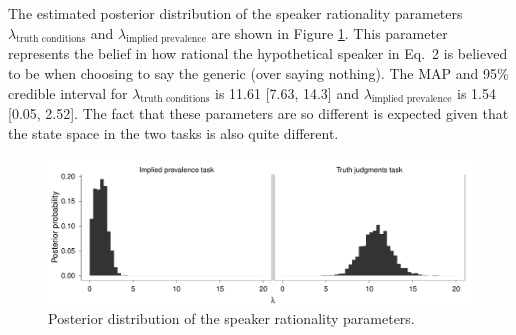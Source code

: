 \documentclass[10pt,letterpaper]{article}
\begin{document}
The estimated posterior distribution of the speaker rationality parameters $\lambda_{\text{truth conditions}}$ and $\lambda_{\text{implied prevalence}}$ are shown in Figure \ref{fig:rationality2}. 
This parameter represents the belief in how rational the hypothetical speaker in Eq.~2 is believed to be when choosing to say the generic (over saying nothing). 
The MAP and 95\% credible interval for $\lambda_{\text{truth conditions}}$ is 11.61 [7.63, 14.3] and $\lambda_{\text{implied prevalence}}$ is 1.54 [0.05, 2.52]. 
The fact that these parameters are so different is expected given that the state space in the two tasks is also quite different.


\begin{figure}
\centering
    \includegraphics[width=0.8\columnwidth]{asymmetry-speakeropts-3x50k.pdf}
    \caption{Posterior distribution of the speaker rationality parameters.}
  \label{fig:rationality2}
\end{figure}

 
\end{document}

